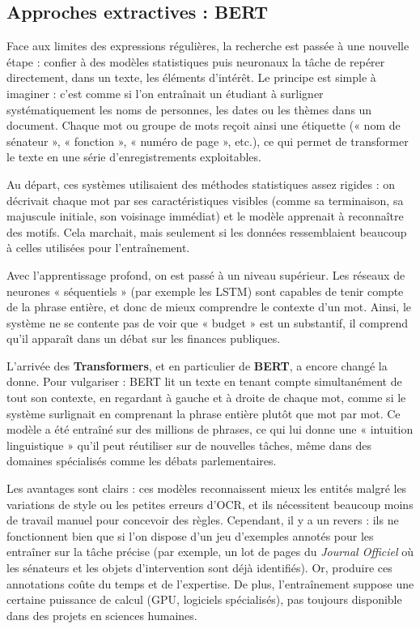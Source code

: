 \subsection{Approches extractives : BERT}

Face aux limites des expressions régulières, la recherche est passée à une nouvelle étape : confier à des modèles statistiques puis neuronaux la tâche de repérer directement, dans un texte, les éléments d’intérêt. Le principe est simple à imaginer : c’est comme si l’on entraînait un étudiant à surligner systématiquement les noms de personnes, les dates ou les thèmes dans un document. Chaque mot ou groupe de mots reçoit ainsi une étiquette (« nom de sénateur », « fonction », « numéro de page », etc.), ce qui permet de transformer le texte en une série d’enregistrements exploitables.

Au départ, ces systèmes utilisaient des méthodes statistiques assez rigides : on décrivait chaque mot par ses caractéristiques visibles (comme sa terminaison, sa majuscule initiale, son voisinage immédiat) et le modèle apprenait à reconnaître des motifs. Cela marchait, mais seulement si les données ressemblaient beaucoup à celles utilisées pour l’entraînement.

Avec l’apprentissage profond, on est passé à un niveau supérieur. Les réseaux de neurones « séquentiels » (par exemple les LSTM) sont capables de tenir compte de la phrase entière, et donc de mieux comprendre le contexte d’un mot. Ainsi, le système ne se contente pas de voir que « budget » est un substantif, il comprend qu’il apparaît dans un débat sur les finances publiques.

L’arrivée des \textbf{Transformers}, et en particulier de \textbf{BERT}, a encore changé la donne. Pour vulgariser : BERT lit un texte en tenant compte simultanément de tout son contexte, en regardant à gauche et à droite de chaque mot, comme si le système surlignait en comprenant la phrase entière plutôt que mot par mot. Ce modèle a été entraîné sur des millions de phrases, ce qui lui donne une « intuition linguistique » qu’il peut réutiliser sur de nouvelles tâches, même dans des domaines spécialisés comme les débats parlementaires.

Les avantages sont clairs : ces modèles reconnaissent mieux les entités malgré les variations de style ou les petites erreurs d’OCR, et ils nécessitent beaucoup moins de travail manuel pour concevoir des règles. Cependant, il y a un revers : ils ne fonctionnent bien que si l’on dispose d’un jeu d’exemples annotés pour les entraîner sur la tâche précise (par exemple, un lot de pages du \emph{Journal Officiel} où les sénateurs et les objets d’intervention sont déjà identifiés). Or, produire ces annotations coûte du temps et de l’expertise. De plus, l’entraînement suppose une certaine puissance de calcul (GPU, logiciels spécialisés), pas toujours disponible dans des projets en sciences humaines.

